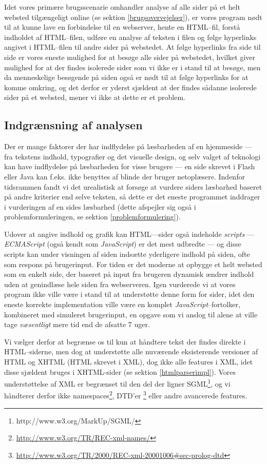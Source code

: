 \documentclass[a4paper,oneside]{memoir}
\begin{document}
Idet vores primære brugsscenarie omhandler analyse af alle sider på et
helt websted tilgængeligt online (se sektion \ref{brugsovervejelser}),
er vores program nødt til at kunne lave en
forbindelse til en webserver, hente en HTML--fil, forstå indholdet af
HTML--filen, udføre en analyse af teksten i filen og følge hyperlinks
angivet i HTML--filen til andre sider på webstedet. At følge hyperlinks
fra side til side er vores eneste mulighed for at besøge alle sider på
webstedet, hvilket giver mulighed for at der findes isolerede sider som
vi ikke er i stand til at besøge, men da menneskelige besøgende på
siden også er nødt til at følge hyperlinks for at komme omkring, og
det derfor er yderst sjældent at der findes sådanne isolerede sider på et
websted, mener vi ikke at dette er et problem.

\subsection{Indgrænsning af analysen}
\label{begraensning}
Der er mange faktorer der har indflydelse på læsbarheden af en
hjemmeside --- fra tekstens indhold, typografier og det visuelle
design, og selv valget af teknologi kan have indflydelse på
læsbarheden for visse brugere --- en side skrevet i Flash eller Java
kan f.eks. ikke benyttes af blinde der bruger netoplæsere. Indenfor
tidsrammen fandt vi det urealistisk at forsøge at vurdere siders
læsbarhed baseret på andre kriterier end selve teksten, så dette er
det eneste programmet inddrager i vurderingen af en sides læsbarhed
(dette afspejler sig også i problemformuleringen, se sektion
\ref{problemformulering}).

Udover at angive indhold og grafik kan HTML---sider også indeholde
\textit{scripts} --- \textit{ECMAScript} (også kendt som
\textit{JavaScript}) er det mest udbredte --- og disse scripts kan
under visningen af siden indsætte yderligere indhold på siden, ofte
som respons på brugerinput. For tiden er det moderne at opbygge et
helt websted som en enkelt side, der baseret på input fra brugeren
dynamisk ændrer indhold uden at genindlæse hele siden fra
webserveren. Igen vurderede vi at vores program ikke ville være i
stand til at understøtte denne form for sider, idet den eneste
korrekte implementation ville være en komplet
\textit{JavaScript}--fortolker, kombineret med simuleret brugerinput,
en opgave som vi anslog til alene at ville tage \textit{væsentligt}
mere tid end de afsatte 7 uger.

Vi vælger derfor at begrænse os til kun at håndtere tekst der findes
direkte i HTML--siderne, men dog at understøtte alle nuværende
eksisterende versioner af HTML og XHTML (HTML skrevet i XML), dog ikke
alle features i XML, idet disse sjældent bruges i XHTML-sider (se
sektion \ref{htmlparserimpl}). Vores understøttelse af XML er
begrænset til den del der ligner
SGML\footnote{http://www.w3.org/MarkUp/SGML/}, og vi håndterer derfor
ikke namespaces\footnote{\url{http://www.w3.org/TR/REC-xml-names/}},
DTD'er
\footnote{\url{http://www.w3.org/TR/2000/REC-xml-20001006\#sec-prolog-dtd}}
eller andre avancerede features.
\end{document}
